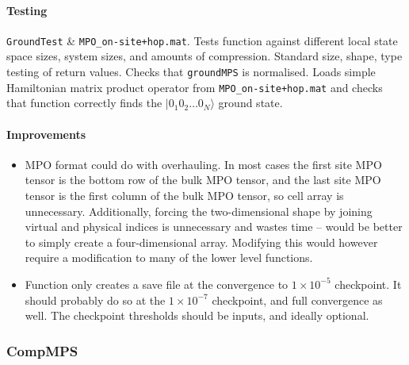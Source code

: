  \paragraph{Testing}
 \lstinline$GroundTest$ \& \lstinline$MPO_on-site+hop.mat$. Tests function against different local state space sizes, system sizes, and amounts of compression. Standard size, shape, type testing of return values. Checks that \lstinline$groundMPS$ is normalised. Loads simple Hamiltonian matrix product operator from \lstinline$MPO_on-site+hop.mat$ and checks that function correctly finds the \(|0_{1}0_{2}\ldots 0_{N} \rangle\) ground state.
 \paragraph{Improvements}
 \begin{itemize}
 \item MPO format could do with overhauling. In most cases the first site MPO tensor is the bottom row of the bulk MPO tensor, and the last site MPO tensor is the first column of the bulk MPO tensor, so cell array is unnecessary. Additionally, forcing the two-dimensional shape by joining virtual and physical indices is unnecessary and wastes time -- would be better to simply create a four-dimensional array. Modifying this would however require a modification to many of the lower level functions.
 \item Function only creates a save file at the convergence to \(1 \times 10^{-5}\) checkpoint. It should probably do so at the \(1 \times 10^{-7}\) checkpoint, and full convergence as well. The checkpoint thresholds should be inputs, and ideally optional.
 \end{itemize}
 
 \subsubsection{CompMPS} 
